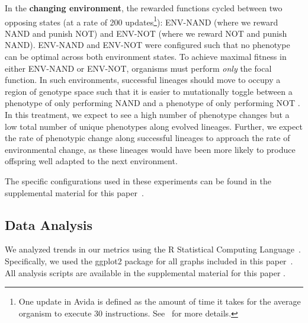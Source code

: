\documentclass[letterpaper]{article}
\begin{document}
In the \textbf{changing environment}, the rewarded functions cycled between 
two opposing states 
(at a rate of 200 updates\footnote{One update  in Avida is  defined  as  the  amount  of  time  it  takes  for  the  average organism  to  execute  30  instructions.  See~\citep{ofria_avida:_2004}  for more details.}): ENV-NAND (where we reward NAND and punish NOT) and ENV-NOT (where we reward NOT and punish NAND). 
ENV-NAND and ENV-NOT were configured such that no phenotype can be optimal across both environment states. To achieve maximal fitness in either ENV-NAND or ENV-NOT, organisms must perform \textit{only} the focal function.
In such environments, successful lineages should move to occupy a region of genotype space such that it is easier to mutationally toggle between a phenotype of only performing NAND and a phenotype of only performing NOT \citep{caninokonig_fluctuating_2018}.
In this treatment, we expect to see a high number of phenotype changes but a low total number of unique phenotypes along evolved lineages.
Further, we expect the rate of phenotypic change along successful lineages to approach the rate of environmental change, as these lineages would have been more likely to produce offspring well adapted to the next environment.

The specific configurations used in these experiments can be found in the supplemental material for this paper~\citep{zenodo_supplement}.


\subsection{Data Analysis}

We analyzed trends in our metrics using the R Statistical Computing Language~\citep{r_core_team_r:_2017}. Specifically, we used the ggplot2 package for all graphs included in this paper~\citep{wickham_ggplot2:_2016}. All analysis scripts are available in the supplemental material for this paper \citep{zenodo_supplement}.
\end{document}
